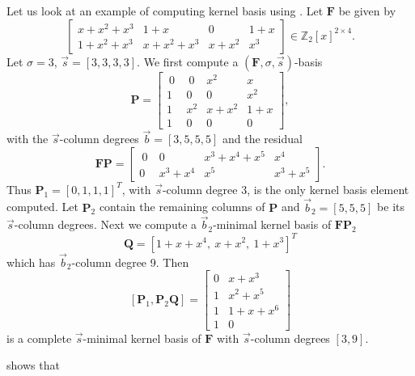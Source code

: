 \begin{example}
\label{exm:continueComputingNullspaceBasisByColumns}Let us look at
an example of computing kernel basis using .
Let $\mathbf{F}$ be given by 
\[
\left[\begin{array}{cccc}
x+x^{2}+x^{3} & 1+x & 0 & 1+x\\
1+x^{2}+x^{3} & x+x^{2}+x^{3} & x+x^{2} & x^{3}
\end{array}\right]\in\mathbb{Z}_{2}\left[x\right]^{2\times4}.
\]
 Let $\sigma=3$, $\vec{s}=\left[3,3,3,3\right]$. We first compute
a $\left(\mathbf{F},\sigma,\vec{s}\right)$-basis 
\[
\mathbf{P}=\left[\begin{array}{cccc}
~0~ & ~0~ & x^{2} & x\\
1 & 0 & 0 & x^{2}\\
1 & x^{2} & x+x^{2} & 1+x\\
1 & 0 & 0 & 0
\end{array}\right],
\]
 with the $\vec{s}$-column degrees $\vec{b}=\left[3,5,5,5\right]$
and the residual 
\[
\mathbf{F}\mathbf{P}=\left[\begin{array}{cccc}
~0~ & 0 & x^{3}+x^{4}+x^{5} & x^{4}\\
0 & x^{3}+x^{4} & x^{5} & x^{3}+x^{5}
\end{array}\right].
\]
 Thus $\mathbf{P}_{1}=[0,1,1,1]^{T}$, %
with $\vec{s}$-column degree $3$, is the only kernel basis element
computed. Let $\mathbf{P}_{2}$ contain the remaining columns of $\mathbf{P}$
and $\vec{b}_{2}=\left[5,5,5\right]$ be its $\vec{s}$-column degrees.
Next we compute a $\vec{b}_{2}$-minimal kernel basis of $\mathbf{F}\mathbf{P}_{2}$
\[
\mathbf{Q}=[1+x+x^{4},\ x+x^{2},\ 1+x^{3}]^{T}
\]
 which has $\vec{b}_{2}$-column degree 9. Then 
\[
\left[\mathbf{P}_{1},\mathbf{P}_{2}\mathbf{Q}\right]=\left[\begin{array}{cc}
0 & x+x^{3}\\
1 & x^{2}+x^{5}\\
1 & 1+x+x^{6}\\
1 & 0
\end{array}\right]
\]
 is a complete $\vec{s}$-minimal kernel basis of $\mathbf{F}$ with
$\vec{s}$-column degrees $\left[3,9\right]$. 
\end{example}
 shows that
